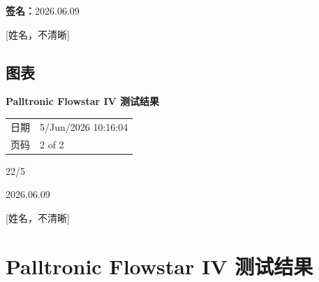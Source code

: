 \documentclass[UTF8,10pt,a4paper,fontset=fandol]{ctexart}
\newcommand{\fieldvalue}[1]{#1}
\newcommand{\handwritten}[1]{#1}
\begin{document}
\vspace{1em}

\textbf{签名：}\handwritten{2026.06.09}

\handwritten{[姓名，不清晰]}

\subsection{图表}

\begin{center}
\textbf{Palltronic Flowstar IV 测试结果}

\begin{tabular}{@{}ll@{}}
日期 &
\fieldvalue{5/Jun/2026 10:16:04}
\\
页码 &
\fieldvalue{2 of 2}
\end{tabular}

\vspace{1em}


\vspace{1em}

\handwritten{22/5}

\handwritten{2026.06.09}

\handwritten{[姓名，不清晰]}
\end{center}

\newpage

\section{Palltronic Flowstar IV 测试结果}
\end{document}
